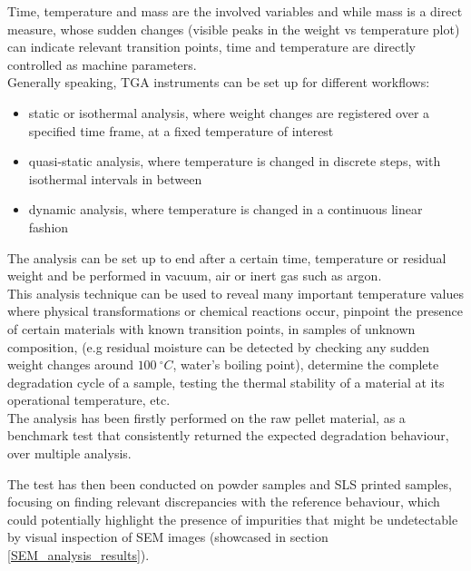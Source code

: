 \documentclass[a4paper]{article}
\begin{document}
        Time, temperature and mass are the involved variables and while mass is a direct measure, whose sudden changes (visible peaks
        in the weight vs temperature plot) can indicate relevant transition points, time and temperature are directly controlled 
        as machine parameters. \\ 

        Generally speaking, TGA instruments can be set up for different workflows: 

                \begin{itemize}
                    \item static or isothermal analysis, where weight changes are registered over a specified time frame, 
                    at a fixed temperature of interest
                    \item quasi-static analysis, where temperature is changed in discrete steps, with isothermal intervals in between 
                    \item dynamic analysis, where temperature is changed in a continuous linear fashion
                \end{itemize}

            The analysis can be set up to end after a certain time, temperature or residual weight and be performed 
            in vacuum, air or inert gas such as argon. \\

        This analysis technique can be used to reveal many important temperature values where physical transformations or chemical 
        reactions occur, pinpoint the presence of certain materials with known transition points, in samples of unknown composition, 
        (e.g residual moisture can be detected by checking any sudden weight changes around $100 \ ^{\circ}C $, water's boiling point), 
        determine the complete degradation cycle of a sample, testing the thermal stability of a material at its operational temperature, etc. \\ 

        The analysis has been firstly performed on the raw pellet material, as a benchmark test
        that consistently returned the expected degradation behaviour, over multiple analysis. 

            The test has then been conducted on powder samples and SLS printed samples, focusing on finding relevant 
            discrepancies with the reference behaviour, which could potentially highlight the presence of impurities
            that might be undetectable by visual inspection of SEM images (showcased in section \ref{SEM_analysis_results}). \\ 
\end{document}
